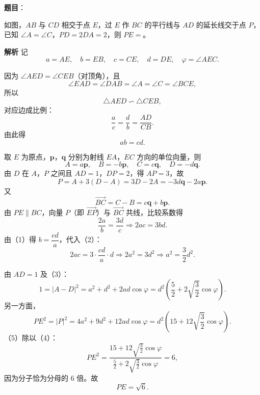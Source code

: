 \begin{answer}

\textbf{题目}：

如图，$AB$ 与 $CD$ 相交于点 $E$，过 $E$ 作 $BC$ 的平行线与 $AD$ 的延长线交于点 $P$，已知 $\angle A=\angle C$，$PD=2DA=2$，则 $PE=$\gkblank{}。
\nopagebreak[4]
\begin{center}\end{center}
\nopagebreak[4]
\textbf{解析}
记
\nopagebreak[4]
\[a=AE,\quad b=EB,\quad c=CE,\quad d=DE,\quad \varphi=\angle AEC.\]

因为 $\angle AED=\angle CEB$（对顶角），且
\nopagebreak[4]
\[\angle EAD=\angle DAB=\angle A=\angle C=\angle BCE,\]
所以
\nopagebreak[4]
\[\triangle AED\backsim\triangle CEB,\]
对应边成比例：
\nopagebreak[4]
\[\frac{a}{c}=\frac{d}{b}=\frac{AD}{CB}.\]
由此得
\nopagebreak[4]
\[ab=cd. \tag{1}\]

取 $E$ 为原点，$\boldsymbol p$，$\boldsymbol q$ 分别为射线 $EA$，$EC$ 方向的单位向量，则
\nopagebreak[4]
\[A=a\boldsymbol p,\quad B=-b\boldsymbol p,\quad C=c\boldsymbol q,\quad D=-d\boldsymbol q.\]
由 $D$ 在 $A$，$P$ 之间且 $AD=1$，$DP=2$，得 $AP=3$，故
\nopagebreak[4]
\[P=A+3(D-A)=3D-2A=-3d\boldsymbol q-2a\boldsymbol p.\]
又
\nopagebreak[4]
\[\overrightarrow{BC}=C-B=c\boldsymbol q+b\boldsymbol p.\]
由 $PE\parallel BC$，向量 $P$（即 $\overrightarrow{EP}$）与 $\overrightarrow{BC}$ 共线，比较系数得
\nopagebreak[4]
\[\frac{2a}{b}=\frac{3d}{c}\Longrightarrow2ac=3bd. \tag{2}\]
由（1）得 $b=\dfrac{cd}{a}$，代入（2）：
\nopagebreak[4]
\[2ac=3\cdot\frac{cd}{a}\cdot d\Longrightarrow2a^2=3d^2\Longrightarrow a^2=\frac32d^2. \tag{3}\]

由 $AD=1$ 及（3）：
\nopagebreak[4]
\[1=|A-D|^2=a^2+d^2+2ad\cos\varphi
=d^2\left(\frac52+2\sqrt{\frac32}\cos\varphi\right). \tag{4}\]
另一方面，
\nopagebreak[4]
\[PE^2=|P|^2=4a^2+9d^2+12ad\cos\varphi
=d^2\left(15+12\sqrt{\frac32}\cos\varphi\right). \tag{5}\]
（5）除以（4）：
\nopagebreak[4]
\[PE^2=\frac{15+12\sqrt{\frac32}\cos\varphi}{\frac52+2\sqrt{\frac32}\cos\varphi}=6,\]
因为分子恰为分母的 $6$ 倍。故
\nopagebreak[4]
\[PE=\sqrt6.\]


\end{answer}
